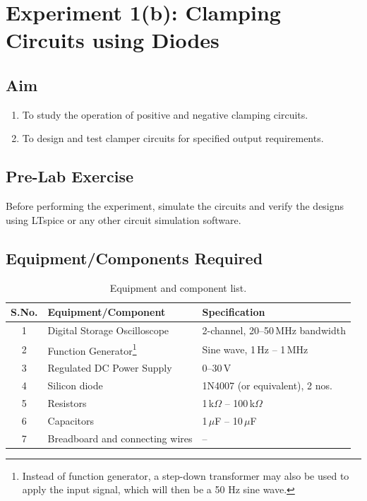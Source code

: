 %

\chapter{Experiment 1(b): Clamping Circuits using Diodes}
\label{sec:expt1}

\section{Aim}
\begin{enumerate}[label=(\roman*)]
	\item To study the operation of positive and negative clamping circuits.
	\item To design and test clamper circuits for specified output requirements.
\end{enumerate}
\section{Pre-Lab Exercise}
Before performing the experiment, simulate the circuits and verify the designs using LTspice or any other circuit simulation software. 
\section{Equipment/Components Required}
\begin{table}[h!]
	\centering
	\begin{tabular}{@{}cll@{}}
		\toprule
		S.No. & Equipment/Component & Specification \\
		\midrule
		1 & Digital Storage Oscilloscope & 2-channel, 20--50\,MHz bandwidth \\
		2 & Function Generator\footnote{Instead of function generator, a step-down transformer may also be used to apply the input signal, which will then be a 50 Hz sine wave.} & Sine wave, 1\,Hz -- 1\,MHz \\
		3 & Regulated DC Power Supply & 0--30\,V \\
		4 & Silicon diode & 1N4007 (or equivalent), 2 nos. \\
		5 & Resistors & 1\,k$\Omega$ -- 100\,k$\Omega$ \\
		6 & Capacitors & 1\,$\mu$F -- 10\,$\mu$F \\
		7 & Breadboard and connecting wires & -- \\
		\bottomrule
	\end{tabular}
	\caption{Equipment and component list.}
\end{table}

